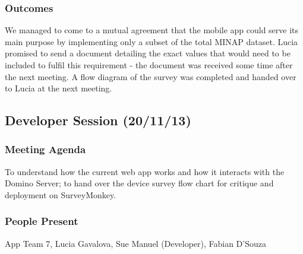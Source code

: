 \documentclass[12pt,a4paper,oneside,titlepage]{article}
\begin{document}
\subsubsection{Outcomes}
We managed to come to a mutual agreement that the mobile app could serve its main purpose by implementing only a subset of the total MINAP dataset. Lucia promised to send a document detailing the exact values that would need to be included to fulfil this requirement - the document was received some time after the next meeting. A flow diagram of the survey was completed and handed over to Lucia at the next meeting.

\subsection{Developer Session (20/11/13)}
\subsubsection{Meeting Agenda}
To understand how the current web app works and how it interacts with the Domino Server; to hand over the device survey flow chart for critique and deployment on SurveyMonkey.
\subsubsection{People Present}
App Team 7, Lucia Gavalova, Sue Manuel (Developer), Fabian D'Souza
\end{document}
